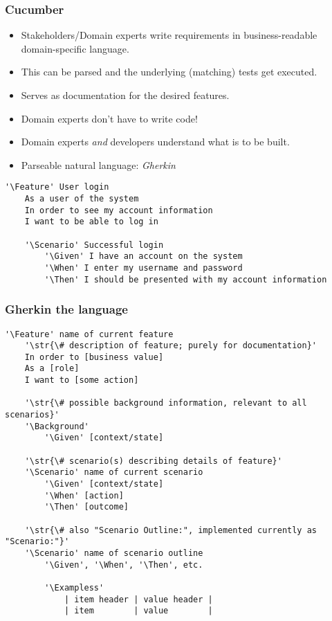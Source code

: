 \documentclass[10pt]{vcs_beamer}
\newcommand{\str}[1]{\color{Turquoise}{#1}}
\newcommand{\Feature}{\color{BlueViolet}{Feature:}}
\newcommand{\Background}{\color{BlueViolet}{Background:}}
\newcommand{\Scenario}{\color{BlueViolet}{Scenario:}}
\newcommand{\Exampless}{\color{BlueViolet}{Examples:}}
\newcommand{\Given}{\color{DarkOrange}{Given}}
\newcommand{\When}{\color{RoyalBlue}{When}}
\newcommand{\Then}{\color{ForestGreen}{Then}}
\begin{document}
\begin{frame}[fragile]
    \frametitle{Cucumber}

\begin{itemize}
    \item Stakeholders/Domain experts write requirements in business-readable
        domain-specific language.
    \item This can be parsed and the underlying (matching) tests get executed.
    \item Serves as documentation for the desired features.
    \item Domain experts don't have to write code!
    \item Domain experts \emph{and} developers understand what is to be built.
    \item Parseable natural language: \emph{Gherkin}
\end{itemize}

\begin{lstlisting}[escapeinside='']
'\Feature' User login
    As a user of the system
    In order to see my account information
    I want to be able to log in

    '\Scenario' Successful login
        '\Given' I have an account on the system
        '\When' I enter my username and password
        '\Then' I should be presented with my account information
\end{lstlisting}
\end{frame}

\begin{frame}[fragile]
\frametitle{Gherkin the language}

\begin{lstlisting}[escapeinside='']
'\Feature' name of current feature
    '\str{\# description of feature; purely for documentation}'
    In order to [business value]
    As a [role]
    I want to [some action]

    '\str{\# possible background information, relevant to all scenarios}'
    '\Background'
        '\Given' [context/state]

    '\str{\# scenario(s) describing details of feature}'
    '\Scenario' name of current scenario
        '\Given' [context/state]
        '\When' [action]
        '\Then' [outcome]

    '\str{\# also "Scenario Outline:", implemented currently as "Scenario:"}'
    '\Scenario' name of scenario outline
        '\Given', '\When', '\Then', etc.

        '\Exampless'
            | item header | value header |
            | item        | value        |
\end{lstlisting}
\end{frame}
\end{document}
